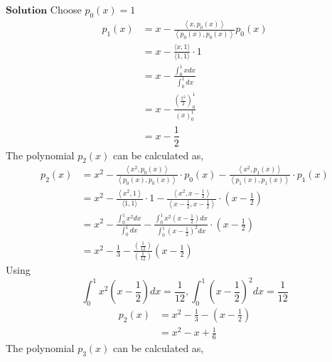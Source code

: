$\boxed{\textbf{Solution}}$ Choose $p_{0}(x)=1$
$$
\begin{aligned}
p_{1}(x) &=x-\frac{\left\langle x, p_{0}(x)\right\rangle}{\left\langle p_{0}(x), p_{0}(x)\right\rangle} p_{0}(x) \\
&=x-\frac{\langle x, 1\rangle}{\langle 1,1\rangle} \cdot 1 \\
&=x-\frac{\int_{0}^{1} x d x}{\int_{0}^{1} d x} \\
&=x-\frac{\left(\frac{x^{2}}{2}\right)_{0}^{1}}{(x)_{0}^{1}} \\
&=x-\dfrac{1}{2}
\end{aligned}
$$
The polynomial $p_{2}(x)$ can be calculated as,
$$
\begin{aligned}
p_{2}(x) &=x^{2}-\frac{\left\langle x^{2}, p_{0}(x)\right\rangle}{\left\langle p_{0}(x), p_{0}(x)\right\rangle} \cdot p_{0}(x)-\frac{\left\langle x^{2}, p_{1}(x)\right\rangle}{\left\langle p_{1}(x), p_{1}(x)\right\rangle} \cdot p_{1}(x) \\
&=x^{2}-\frac{\left\langle x^{2}, 1\right\rangle}{\langle 1,1\rangle} \cdot 1-\frac{\left\langle x^{2}, x-\frac{1}{2}\right\rangle}{\left\langle x-\frac{1}{2}, x-\frac{1}{2}\right\rangle} \cdot\left(x-\frac{1}{2}\right) \\
&=x^{2}-\frac{\int_{0}^{1} x^{2} d x}{\int_{0}^{1} d x}-\frac{\int_{0}^{1} x^{2}\left(x-\frac{1}{2}\right) d x}{\int_{0}^{1}\left(x-\frac{1}{2}\right)^{2} d x} \cdot\left(x-\frac{1}{2}\right) \\
&=x^{2}-\frac{1}{3}-\frac{\left(\frac{1}{12}\right)}{\left(\frac{1}{12}\right)}\left(x-\frac{1}{2}\right) 
\end{aligned}
$$
Using
$$
\int_{0}^{1} x^{2}\left(x-\frac{1}{2}\right) d x=\frac{1}{12}, \int_{0}^{1}\left(x-\frac{1}{2}\right)^{2} d x=\frac{1}{12}
$$
$$
\begin{aligned}
p_{2}(x) &=x^{2}-\frac{1}{3}-\left(x-\frac{1}{2}\right) \\
&=x^{2}-x+\frac{1}{6} 
\end{aligned}
$$
The polynomial $p_{3}(x)$ can be calculated as,
